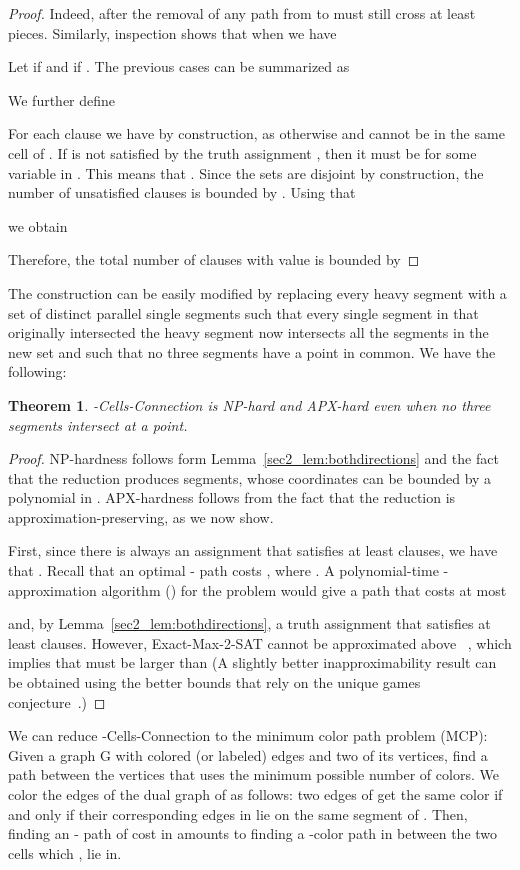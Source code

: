 \documentclass[11pt,a4paper]{article}
\newtheorem{theorem}[definition]{Theorem}
\begin{document}
\begin{proof}
Indeed, after the removal of  any path from  to  must still cross at least  pieces. Similarly, inspection shows that when  we have 
 
Let  if  and  if . The previous cases can be summarized as 

We further define

For each clause  we have  by construction, as otherwise  and  cannot be in the same cell of . If  is not satisfied by the truth assignment , then it must be  for some variable  in . This means that  
. Since the sets  are disjoint by construction, the number of unsatisfied clauses is bounded by .
Using that 

we obtain 

Therefore, the total number of clauses with value  is bounded by

\end{proof}
The construction can be easily modified by replacing every heavy segment with a set of  distinct parallel single segments such that every single segment in  that originally intersected the heavy segment now intersects all the segments in the new set and such that no three segments have a point in common. We have the following:

\begin{theorem}\label{NP-hard}
 {\sc -Cells-Connection} is NP-hard and APX-hard even when no three segments intersect at a point.
\end{theorem}
\begin{proof}
NP-hardness follows form Lemma~\ref{sec2_lem:bothdirections} and the fact that the reduction produces  segments, whose coordinates can be bounded by a polynomial in . APX-hardness follows from the fact that the reduction is approximation-preserving, as we now show.

	First, since there is always an assignment that satisfies at least  clauses, we have that . Recall that an optimal - path costs , where . A polynomial-time -approximation algorithm () for the problem would give a path that costs at most

	
	and, by Lemma~\ref{sec2_lem:bothdirections}, a truth assignment that satisfies at least 
	 clauses. However, {\sc Exact-Max-2-SAT} cannot be approximated 
	above ~\cite{Hastad01}, which implies that  must be larger than 
	(A slightly better inapproximability result can be obtained using the better bounds that rely on the unique games conjecture~\cite{kkmo-oir-07}.)
\end{proof}

We can reduce {\sc -Cells-Connection} to the minimum color path problem (MCP): 
Given a graph G with colored (or labeled) edges and two of its vertices, find a path between the vertices that uses the minimum possible number of colors.
We color the edges of the dual graph  of  as follows: two edges of  get the same color if and only if their corresponding edges in  lie on the same segment of .
Then, finding an - path of cost  in  amounts to finding a -color path in  between the two cells which ,  lie in.
\end{document}
